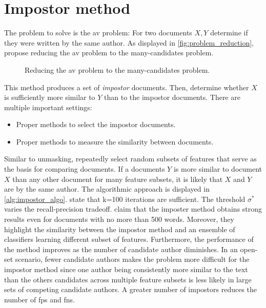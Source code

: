 \section{Impostor method}
\label{sec:impostor_method}

The problem to solve is the \ac{av} problem:
For two documents $X, Y$ determine if they were written by the same author.
As displayed in \autoref{fig:problem_reduction}, \citet{koppel_determining_2014} propose reducing the \ac{av} problem to the many-candidates problem.

\begin{figure}[htbp]
    \centering
    
    \caption{Reducing the \ac{av} problem to the many-candidates problem.}
    \label{fig:problem_reduction}
\end{figure}

This method produces a set of \textit{impostor} documents.
Then, \citet{koppel_determining_2014} determine whether $X$ is sufficiently more similar to $Y$ than to the impostor documents.
There are multiple important settings:
\begin{itemize}
    \item Proper methods to select the impostor documents.
    \item Proper methods to measure the similarity between documents.
\end{itemize}
Similar to unmasking, \citet{koppel_determining_2014} repeatedly select random subsets of features that serve as the basis for comparing documents.
If a documents $Y$ is more similar to document $X$ than any other document for many feature subsets, 
it is likely that $X$ and $Y$ are by the same author.
The algorithmic approach is displayed in \autoref{alg:impostor_algo}.
\citet{koppel_determining_2014} state that k=100 iterations are sufficient.
The threshold $\sigma^*$ varies the recall-precision tradeoff.
\citet{koppel_determining_2014} claim that the imposter method obtains strong results even for documents with no more than 500 words.
Moreover, they highlight the similarity between the impostor method and an ensemble of classifiers learning different subset of features.
Furthermore, the performance of the method improves as the number of candidate author diminishes.
In an open-set scenario, fewer candidate authors makes the problem more difficult for the impostor method 
since one author being consistently more similar to the text than the others candidates across multiple feature subsets is less likely in large sets of competing candidate authors.
A greater number of impostors reduces the number of \acp{fp} and \acp{fn}.

